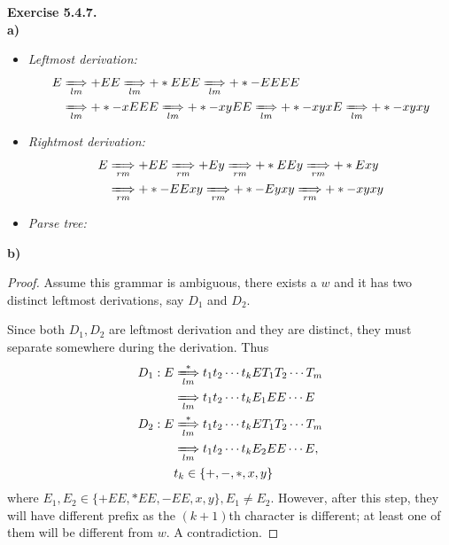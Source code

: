 \documentclass[a4paper]{article}
\newtheorem*{proof}{Proof}
\newenvironment{exercise}[1]{
	\par
	\noindent\textbf{Exercise #1.}\quad
}{
	\par
	\bigskip
}
\newcommand{\mylm}{\xLongrightarrow[lm]{}}
\newcommand{\myrm}{\xLongrightarrow[rm]{}}
\begin{document}
\begin{exercise}{5.4.7}\hspace{0pt}\\
\textbf{a)}
\begin{itemize}
\item \textit{Leftmost derivation:}
    \begin{align*}
        E&\mylm +EE\mylm +*EEE\mylm +*-EEEE\\
        &\mylm +*-xEEE\mylm +*-xyEE\mylm +*-xyxE\mylm +*-xyxy
    \end{align*}
\item \textit{Rightmost derivation:}
    \begin{align*}
        E&\myrm +EE\myrm +Ey\myrm +*EEy\myrm +*Exy\\
        &\myrm +*-EExy\myrm +*-Eyxy\myrm +*-xyxy
    \end{align*}
\item \textit{Parse tree:}
    \begin{center}
    \end{center}
\end{itemize}
\textbf{b)}
    \begin{proof}
        Assume this grammar is ambiguous, there exists a $w$ and it has two distinct
        leftmost derivations, say $D_1$ and $D_2$.\par
        Since both $D_1,D_2$ are leftmost derivation and they are distinct, they
        must separate somewhere during the derivation. Thus
        \begin{align*}
            D_1: E&\xLongrightarrow[lm]{*} t_1t_2\cdots t_kET_1T_2\cdots T_m\\
            &\mylm t_1t_2\cdots t_kE_1EE\cdots E\\
            D_2: E&\xLongrightarrow[lm]{*} t_1t_2\cdots t_kET_1T_2\cdots T_m\\
            &\mylm t_1t_2\cdots t_kE_2EE\cdots E,\\
            & t_k\in\{+,-,*,x,y\}
        \end{align*}
        where $E_1,E_2\in\{+EE,*EE,-EE,x,y\},E_1\neq E_2$.
        However, after this step, they will have different prefix as the $(k+1)$th character
        is different; at least one of them will be different from $w$. A contradiction.
    \end{proof}
\end{exercise}
\end{document}
